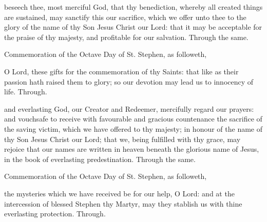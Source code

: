 \secret
{} beseech thee, most merciful God, that thy benediction, whereby all created things are sustained, may sanctify this our sacrifice, which we offer unto thee to the glory of the name of thy Son Jesus Christ our Lord: that it may be acceptable for the praise of thy majesty, and profitable for our salvation. Through the same.
\begin{rubric}
	Commemoration of the Octave Day of St. Stephen, as followeth,
\end{rubric}
 O Lord, these gifts for the commemoration of thy Saints: that like as their passion hath raised them to glory; so our devotion may lead us to innocency of life. Through.


\postcommunion
{} and everlasting God, our Creator and Redeemer, mercifully regard our prayers: and vouchsafe to receive with favourable and gracious countenance the sacrifice of the saving victim, which we have offered to thy majesty; in honour of the name of thy Son Jesus Christ our Lord; that we, being fulfilled with thy grace, may rejoice that our names are written in heaven beneath the glorious name of Jesus, in the book of everlasting predestination. Through the same.
\begin{rubric}
	Commemoration of the Octave Day of St. Stephen, as followeth,
\end{rubric}
 the mysteries which we have received be for our help, O Lord: and at the intercession of blessed Stephen thy Martyr, may they stablish us with thine everlasting protection. Through.


\clearpage
